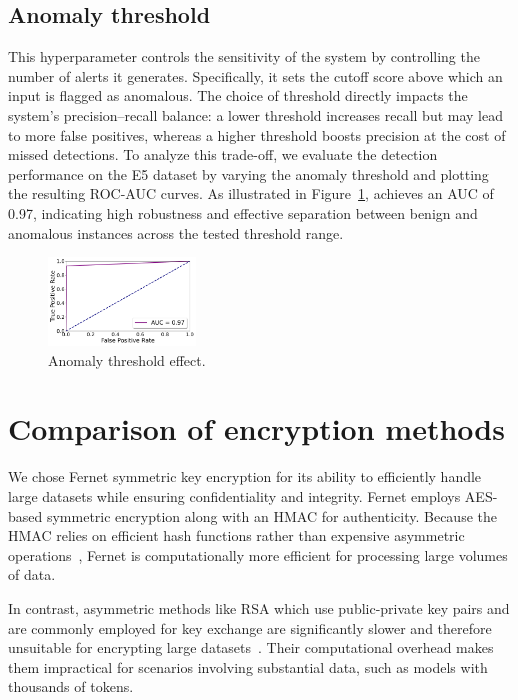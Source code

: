 \subsection{Anomaly threshold}
\label{app:threshold}

This hyperparameter controls the sensitivity of the \Sys system by controlling the number of alerts it generates. Specifically, it sets the cutoff score above which an input is flagged as anomalous. The choice of threshold directly impacts the system's precision–recall balance: a lower threshold increases recall but may lead to more false positives, whereas a higher threshold boosts precision at the cost of missed detections. To analyze this trade-off, we evaluate the detection performance on the E5 dataset by varying the anomaly threshold and plotting the resulting ROC-AUC curves. As illustrated in Figure~\ref{thresh}, \Sys achieves an AUC of 0.97, indicating high robustness and effective separation between benign and anomalous instances across the tested threshold range.

\begin{figure}[!h]
  \centering
  \includegraphics[width=0.35\textwidth]{fig/thresh.pdf}
  \caption{Anomaly threshold effect.}
  \label{thresh}
  \vspace{-2ex}
\end{figure}

\section{Comparison of encryption methods}
\label{app:encrypt}

We chose Fernet symmetric key encryption for its ability to efficiently handle large datasets while ensuring confidentiality and integrity. Fernet employs AES-based symmetric encryption along with an HMAC for authenticity. Because the HMAC relies on efficient hash functions rather than expensive asymmetric operations~\cite{raj2023performance}, Fernet is computationally more efficient for processing large volumes of data.

In contrast, asymmetric methods like RSA which use public-private key pairs and are commonly employed for key exchange are significantly slower and therefore unsuitable for encrypting large datasets~\cite{menezes2018handbook}. Their computational overhead makes them impractical for scenarios involving substantial data, such as \wordvec models with thousands of tokens.

